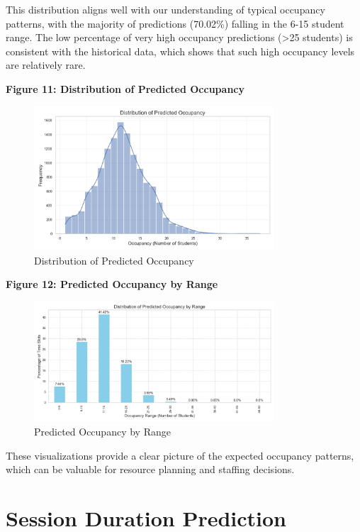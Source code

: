 \documentclass[12pt,letterpaper]{article}
\begin{document}
This distribution aligns well with our understanding of typical occupancy patterns, with the majority of predictions (70.02\%) falling in the 6-15 student range. The low percentage of very high occupancy predictions (>25 students) is consistent with the historical data, which shows that such high occupancy levels are relatively rare.

\textbf{Figure 11: Distribution of Predicted Occupancy}

\begin{figure}[H]
    \centering
    \includegraphics[width=0.8\textwidth]{occupancy_prediction/visualizations/occupancy_predictions_histogram.png}
    \caption{Distribution of Predicted Occupancy}
\end{figure}

\textbf{Figure 12: Predicted Occupancy by Range}

\begin{figure}[H]
    \centering
    \includegraphics[width=0.8\textwidth]{occupancy_prediction/visualizations/occupancy_predictions_by_range.png}
    \caption{Predicted Occupancy by Range}
\end{figure}

These visualizations provide a clear picture of the expected occupancy patterns, which can be valuable for resource planning and staffing decisions.

\section{Session Duration Prediction}
\end{document}

